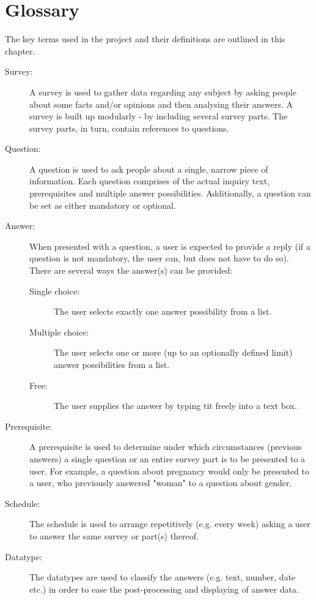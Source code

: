 \chapter{Glossary}
\label{chap:glossary}
The key terms used in the project and their definitions are outlined in this chapter.

\begin{description}
\item[Survey:] A survey is used to gather data regarding any subject by asking people about some facts and/or opinions and then analysing their answers. A survey is built up modularly - by including several survey parts. The survey parts, in turn, contain references to questions. 
\item[Question:] A question is used to ask people about a single, narrow piece of information. Each question comprises of the actual inquiry text, prerequisites and multiple answer possibilities. Additionally, a question can be set as either mandatory or optional.
\item[Answer:] When presented with a question, a user is expected to provide a reply (if a question is not mandatory, the user can, but does not have to do so). There are several ways the answer(s) can be provided:
  \begin{description}
    \item[Single choice:] The user selects exactly one answer possibility from a list.
    \item[Multiple choice:] The user selects one or more (up to an optionally defined limit) answer possibilities from a list.
    \item[Free:] The user supplies the answer by typing tit freely into a text box.
  \end{description}
\item[Prerequisite:] A prerequisite is used to determine under which circumstances (previous answers) a single question or an entire survey part is to be presented to a user. For example, a question about pregnancy would only be presented to a user, who previously answered "woman" to a question about gender.
\item[Schedule:] The schedule is used to arrange repetitively (e.g. every week) asking a user to answer the same survey or part(s) thereof.
\item[Datatype:] The datatypes are used to classify the answers (e.g. text, number, date etc.) in order to ease the post-processing and displaying of answer data.
\end{description}